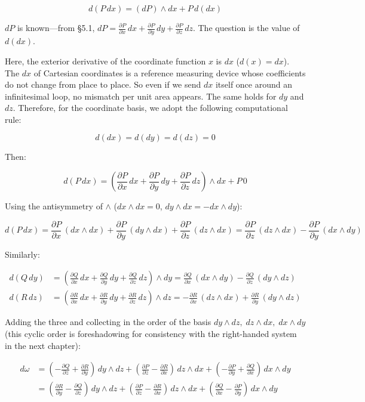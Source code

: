 \[d(P\,dx) = (dP) \wedge dx + P\,d(dx)\]

\(dP\) is known---from §5.1,
\(dP = \frac{\partial P}{\partial x}\,dx + \frac{\partial P}{\partial y}\,dy + \frac{\partial P}{\partial z}\,dz\).
The question is the value of \(d(dx)\).

Here, the exterior derivative of the coordinate function \(x\) is \(dx\)
(\(d(x) = dx\)). The \(dx\) of Cartesian coordinates is a reference
measuring device whose coefficients do not change from place to place.
So even if we send \(dx\) itself once around an infinitesimal loop, no
mismatch per unit area appears. The same holds for \(dy\) and \(dz\).
Therefore, for the coordinate basis, we adopt the following
computational rule:

\[d(dx) = d(dy) = d(dz) = 0\]

Then:

\[d(P\,dx) = (\frac{\partial P}{\partial x}\,dx + \frac{\partial P}{\partial y}\,dy + \frac{\partial P}{\partial z}\,dz) \wedge dx + P\,0\]

Using the antisymmetry of \(\wedge\) (\(dx \wedge dx = 0\),
\(dy \wedge dx = -dx \wedge dy\)):

\[d(P\,dx) = \frac{\partial P}{\partial x}\,(dx \wedge dx) + \frac{\partial P}{\partial y}\,(dy \wedge dx) + \frac{\partial P}{\partial z}\,(dz \wedge dx) = \frac{\partial P}{\partial z}\,(dz \wedge dx) - \frac{\partial P}{\partial y}\,(dx \wedge dy)\]

Similarly:

\[\begin{aligned}
d(Q\,dy) &= (\frac{\partial Q}{\partial x}\,dx + \frac{\partial Q}{\partial y}\,dy + \frac{\partial Q}{\partial z}\,dz) \wedge dy = \frac{\partial Q}{\partial x}\,(dx \wedge dy) - \frac{\partial Q}{\partial z}\,(dy \wedge dz) \\
d(R\,dz) &= (\frac{\partial R}{\partial x}\,dx + \frac{\partial R}{\partial y}\,dy + \frac{\partial R}{\partial z}\,dz) \wedge dz = -\frac{\partial R}{\partial x}\,(dz \wedge dx) + \frac{\partial R}{\partial y}\,(dy \wedge dz)
\end{aligned}\]

Adding the three and collecting in the order of the basis
\(dy \wedge dz,\; dz \wedge dx,\; dx \wedge dy\) (this cyclic order is
foreshadowing for consistency with the right-handed system in the next
chapter):

\[\begin{aligned}
d\omega &= (-\frac{\partial Q}{\partial z} + \frac{\partial R}{\partial y})\,dy \wedge dz + (\frac{\partial P}{\partial z} - \frac{\partial R}{\partial x})\,dz \wedge dx + (-\frac{\partial P}{\partial y} + \frac{\partial Q}{\partial x})\,dx \wedge dy \\
&= (\frac{\partial R}{\partial y} - \frac{\partial Q}{\partial z})\,dy \wedge dz + (\frac{\partial P}{\partial z} - \frac{\partial R}{\partial x})\,dz \wedge dx + (\frac{\partial Q}{\partial x} - \frac{\partial P}{\partial y})\,dx \wedge dy
\end{aligned}\]

